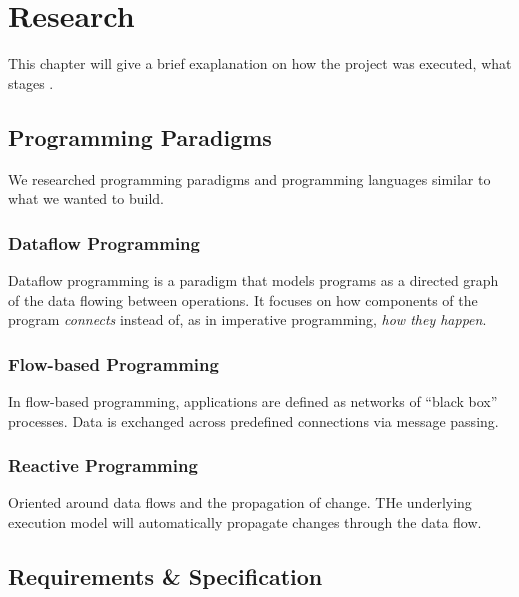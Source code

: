 \chapter{Research}\label{chap:research}
This chapter will give a brief exaplanation on how the project was
executed, what stages .




\section{Programming Paradigms}
We researched programming paradigms and programming languages similar
to what we wanted to build.

\subsection{Dataflow Programming}
Dataflow programming is a paradigm that models programs as a directed
graph of the data flowing between operations. It focuses on how
components of the program \emph{connects} instead of, as in imperative
programming, \emph{how they happen}. 

\subsection{Flow-based Programming}
In flow-based programming, applications are defined as networks of
``black box'' processes. Data is exchanged across predefined
connections via message passing. 

\subsection{Reactive Programming}
Oriented around data flows and the propagation of change. THe
underlying execution model will automatically propagate changes
through the data flow. 


\section{Requirements \& Specification}

